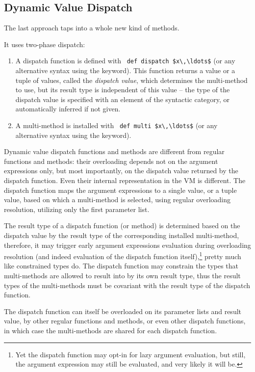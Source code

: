 \subsection{Dynamic Value Dispatch}
\label{sec:dynamic-value-dispatch}

The last approach taps into a whole new kind of methods. 

It uses two-phase dispatch:
\begin{enumerate}
  \item A dispatch function is defined with ~\lstinline!def dispatch $x\,\ldots$! (or any alternative syntax using the  keyword). This function returns a value or a tuple of values, called the {\em dispatch value}, which determines the multi-method to use, but its result type is independent of this value -- the type of the dispatch value is specified with an element of the  syntactic category, or automatically inferred if not given. 
  \item A multi-method is installed with ~\lstinline!def multi $x\,\ldots$! (or any alternative syntax using the  keyword).
\end{enumerate}

Dynamic value dispatch functions and methods are different from regular functions and methods: their overloading depends not on the argument expressions only, but most importantly, on the dispatch value returned by the dispatch function. Even their internal representation in the VM is different. The dispatch function maps the argument expressions to a single value, or a tuple value, based on which a multi-method is selected, using regular overloading resolution, utilizing only the first parameter list. 

The result type of a dispatch function (or method) is determined based on the dispatch value by the result type of the corresponding installed multi-method, therefore, it may trigger early argument expressions evaluation during overloading resolution (and indeed evaluation of the dispatch function itself),\footnote{Yet the dispatch function may opt-in for lazy argument evaluation, but still, the argument expression may still be evaluated, and very likely it will be.} pretty much like constrained types do. The dispatch function may constrain the types that multi-methods are allowed to result into by its own result type, thus the result types of the multi-methods must be covariant with the result type of the dispatch function. 

The dispatch function can itself be overloaded on its parameter lists and result value, by other regular functions and methods, or even other dispatch functions, in which case the multi-methods are shared for each dispatch function. 

